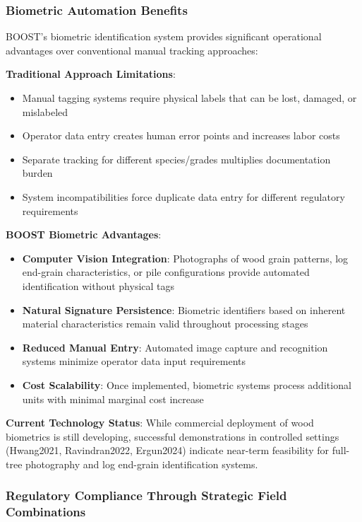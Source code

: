 \subsubsection{Biometric Automation Benefits}

BOOST's biometric identification system provides significant operational advantages over conventional manual tracking approaches:

\textbf{Traditional Approach Limitations}:
\begin{itemize}
\item Manual tagging systems require physical labels that can be lost, damaged, or mislabeled
\item Operator data entry creates human error points and increases labor costs
\item Separate tracking for different species/grades multiplies documentation burden
\item System incompatibilities force duplicate data entry for different regulatory requirements
\end{itemize}

\textbf{BOOST Biometric Advantages}:
\begin{itemize}
\item \textbf{Computer Vision Integration}: Photographs of wood grain patterns, log end-grain characteristics, or pile configurations provide automated identification without physical tags
\item \textbf{Natural Signature Persistence}: Biometric identifiers based on inherent material characteristics remain valid throughout processing stages
\item \textbf{Reduced Manual Entry}: Automated image capture and recognition systems minimize operator data input requirements
\item \textbf{Cost Scalability}: Once implemented, biometric systems process additional units with minimal marginal cost increase
\end{itemize}

\textbf{Current Technology Status}: While commercial deployment of wood biometrics is still developing, successful demonstrations in controlled settings (Hwang2021, Ravindran2022, Ergun2024) indicate near-term feasibility for full-tree photography and log end-grain identification systems.

\subsubsection{Regulatory Compliance Through Strategic Field Combinations}

